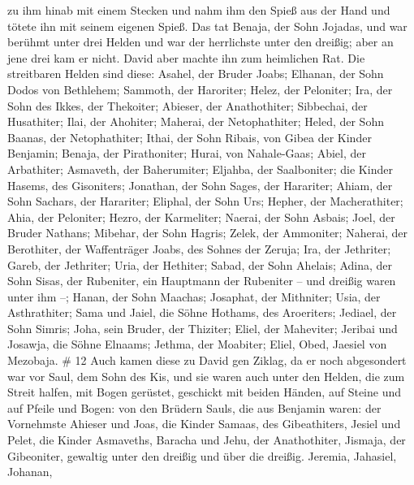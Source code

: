 zu ihm hinab mit einem Stecken und nahm ihm den Spieß aus der Hand und
tötete ihn mit seinem eigenen Spieß.  Das tat Benaja, der
Sohn Jojadas, und war berühmt unter drei Helden  und war
der herrlichste unter den dreißig; aber an jene drei kam er nicht. David
aber machte ihn zum heimlichen Rat.  Die streitbaren Helden
sind diese: Asahel, der Bruder Joabs; Elhanan, der Sohn Dodos von
Bethlehem;  Sammoth, der Haroriter; Helez, der Peloniter;
 Ira, der Sohn des Ikkes, der Thekoiter; Abieser, der
Anathothiter;  Sibbechai, der Husathiter; Ilai, der
Ahohiter;  Maherai, der Netophathiter; Heled, der Sohn
Baanas, der Netophathiter;  Ithai, der Sohn Ribais, von
Gibea der Kinder Benjamin; Benaja, der Pirathoniter; 
Hurai, von Nahale-Gaas; Abiel, der Arbathiter;  Asmaveth,
der Baherumiter; Eljahba, der Saalboniter;  die Kinder
Hasems, des Gisoniters; Jonathan, der Sohn Sages, der Harariter;
 Ahiam, der Sohn Sachars, der Harariter; Eliphal, der Sohn
Urs;  Hepher, der Macherathiter; Ahia, der Peloniter;
 Hezro, der Karmeliter; Naerai, der Sohn Asbais;
 Joel, der Bruder Nathans; Mibehar, der Sohn Hagris;
 Zelek, der Ammoniter; Naherai, der Berothiter, der
Waffenträger Joabs, des Sohnes der Zeruja;  Ira, der
Jethriter; Gareb, der Jethriter;  Uria, der Hethiter;
Sabad, der Sohn Ahelais;  Adina, der Sohn Sisas, der
Rubeniter, ein Hauptmann der Rubeniter -- und dreißig waren unter ihm
--;  Hanan, der Sohn Maachas; Josaphat, der Mithniter;
 Usia, der Asthrathiter; Sama und Jaiel, die Söhne Hothams,
des Aroeriters;  Jediael, der Sohn Simris; Joha, sein
Bruder, der Thiziter;  Eliel, der Maheviter; Jeribai und
Josawja, die Söhne Elnaams; Jethma, der Moabiter;  Eliel,
Obed, Jaesiel von Mezobaja. \# 12  Auch kamen diese zu David
gen Ziklag, da er noch abgesondert war vor Saul, dem Sohn des Kis, und
sie waren auch unter den Helden, die zum Streit halfen,  mit
Bogen gerüstet, geschickt mit beiden Händen, auf Steine und auf Pfeile
und Bogen: von den Brüdern Sauls, die aus Benjamin waren: 
der Vornehmste Ahieser und Joas, die Kinder Samaas, des Gibeathiters,
Jesiel und Pelet, die Kinder Asmaveths, Baracha und Jehu, der
Anathothiter,  Jismaja, der Gibeoniter, gewaltig unter den
dreißig und über die dreißig.  Jeremia, Jahasiel, Johanan,
